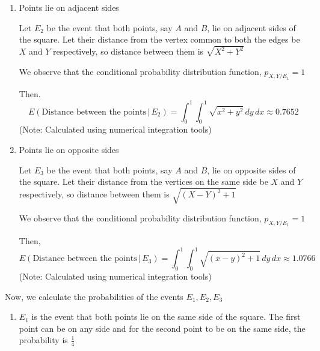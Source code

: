 \documentclass[12pt, oneside]{article}
\begin{document}
\begin{enumerate}
{\begin{enumerate}
{            We observe that the conditional probability distribution function,
            \(p_{X, Y / E_1} = 1\) 

            Then, \[
                E(\text{Distance between the points} \,|\, E_1) = \int_{0}^{1} \int_{0}^{1}
                   |x - y| \,dy \,dx = \frac{1}{3}
            \]
        }

        \item {
            Points lie on adjacent sides

            Let \(E_2\) be the event that both points, say \(A\) and \(B\), lie on
            adjacent sides of the square. Let their distance from the vertex common to
            both the edges be \(X\) and \(Y\) respectively, so distance between them is
            \(\sqrt{X^2 + Y^2}\)

            We observe that the conditional probability distribution function,
            \(p_{X, Y / E_1} = 1\) 

            Then. \[
                E(\text{Distance between the points} \,|\, E_2) = \int_{0}^{1} \int_{0}^{1}
                \sqrt{x^2 + y^2} \,dy \,dx \approx 0.7652
            \]
            \hfill (Note: Calculated using numerical integration tools)
        }

        \item {
            Points lie on opposite sides

            Let \(E_3\) be the event that both points, say \(A\) and \(B\), lie on
            opposite sides of the square. Let their distance from the vertices on the
            same side be \(X\) and \(Y\) respectively, so distance between them is
            \(\sqrt{(X - Y)^2 + 1}\)

            We observe that the conditional probability distribution function,
            \(p_{X, Y / E_1} = 1\) 

            Then, \[
                E(\text{Distance between the points} \,|\, E_3) = \int_{0}^{1} \int_{0}^{1}
                   \sqrt{(x-y)^2 + 1} \,dy \,dx \approx 1.0766
            \]
            \hfill (Note: Calculated using numerical integration tools)
        }
    \end{enumerate}

    Now, we calculate the probabilities of the events \(E_1, E_2, E_3\)

    \begin{enumerate}
        \item {
            \(E_1\) is the event that both points lie on the same side of the square.
            The first point can be on any side and for the second point to be on
            the same side, the probability is \(\frac{1}{4}\)

}
\end{enumerate}}
\end{enumerate}
\end{document}
